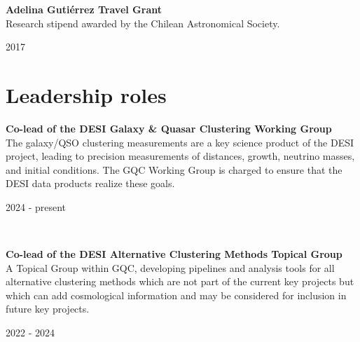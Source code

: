 \documentclass[12pt, a4paper]{article} %
\begin{document}
\begin{minipage}[t]{0.7\textwidth}
\begin{flushleft}%
  \setlength{\leftskip}{0.2cm}%
\textbf{Adelina Guti\'errez Travel Grant}\\
Research stipend awarded by the Chilean Astronomical Society.
\end{flushleft}
\end{minipage}
\begin{minipage}[t]{0.3\textwidth}
\hfill 2017
\end{minipage}


\section*{Leadership roles}

\begin{minipage}[t]{0.7\textwidth}
\begin{flushleft}%
  \setlength{\leftskip}{0.2cm}%
\textbf{Co-lead of the DESI Galaxy \& Quasar Clustering Working Group}\\
The galaxy/QSO clustering measurements are a key science product of the DESI project, leading to precision
measurements of distances, growth, neutrino masses, and initial conditions. The GQC Working Group is charged
to ensure that the DESI data products realize these goals.\\
 \end{flushleft}
\end{minipage}
\begin{minipage}[t]{0.3\textwidth}
\hfill 2024 - present
\end{minipage}\\

\begin{minipage}[t]{0.7\textwidth}
\begin{flushleft}%
  \setlength{\leftskip}{0.2cm}%
\textbf{Co-lead of the DESI Alternative Clustering Methods Topical Group}\\
A Topical Group within GQC, developing pipelines and analysis tools for all alternative clustering methods
which are not part of the current key projects but which can add cosmological information and may be considered
for inclusion in future key projects.\\
 \end{flushleft}
\end{minipage}
\begin{minipage}[t]{0.3\textwidth}
\hfill 2022 - 2024
\end{minipage}\\
\end{document}
